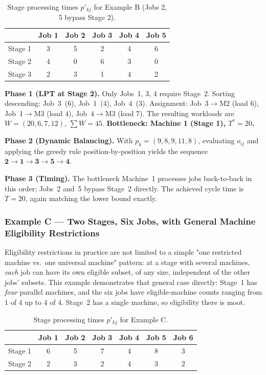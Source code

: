 \documentclass[11pt,a4paper]{article}
\begin{document}
\begin{table}[h!]
\centering
\begin{tabular}{@{}lccccc@{}}
\toprule
 & Job 1 & Job 2 & Job 3 & Job 4 & Job 5 \\
\midrule
Stage 1 & 3 & 5 & 2 & 4 & 6 \\
Stage 2 & 4 & 0 & 6 & 3 & 0 \\
Stage 3 & 2 & 3 & 1 & 4 & 2 \\
\bottomrule
\end{tabular}
\caption{Stage processing times $p'_{kj}$ for Example B (Jobs 2, 5 bypass Stage 2).}
\end{table}

\textbf{Phase 1 (LPT at Stage 2).} Only Jobs~1, 3, 4 require Stage~2.
Sorting descending: Job~3~(6), Job~1~(4), Job~4~(3). Assignment:
Job~3$\to$M2 (load 6), Job~1$\to$M3 (load 4), Job~4$\to$M3 (load 7). The
resulting workloads are $W=(20,6,7,12)$, $\sum W = 45$.
\textbf{Bottleneck: Machine 1 (Stage 1), $T^\ast = 20$.}

\textbf{Phase 2 (Dynamic Balancing).} With $p_k = (9,8,9,11,8)$, evaluating
$o_{ij}$ and applying the greedy rule position-by-position yields the
sequence $\mathbf{2 \to 1 \to 3 \to 5 \to 4}$.

\textbf{Phase 3 (Timing).} The bottleneck Machine~1 processes jobs
back-to-back in this order; Jobs~2 and~5 bypass Stage~2 directly. The
achieved cycle time is $T = 20$, again matching the lower bound exactly.

\subsubsection*{Example C --- Two Stages, Six Jobs, with General
  Machine Eligibility Restrictions}

Eligibility restrictions in practice are not limited to a simple
"one restricted machine vs.\ one universal machine" pattern: at a stage
with several machines, \emph{each} job can have its own eligible
subset, of any size, independent of the other jobs' subsets. This
example demonstrates that general case directly: Stage~1 has \emph{four}
parallel machines, and the six jobs have eligible-machine counts ranging
from $1$ of $4$ up to $4$ of $4$. Stage~2 has a single machine, so
eligibility there is moot.

\begin{table}[h!]
\centering
\begin{tabular}{@{}lcccccc@{}}
\toprule
 & Job 1 & Job 2 & Job 3 & Job 4 & Job 5 & Job 6 \\
\midrule
Stage 1 & 6 & 5 & 7 & 4 & 8 & 3 \\
Stage 2 & 2 & 3 & 2 & 4 & 3 & 2 \\
\bottomrule
\end{tabular}
\caption{Stage processing times $p'_{kj}$ for Example C.}
\end{table}
\end{document}

